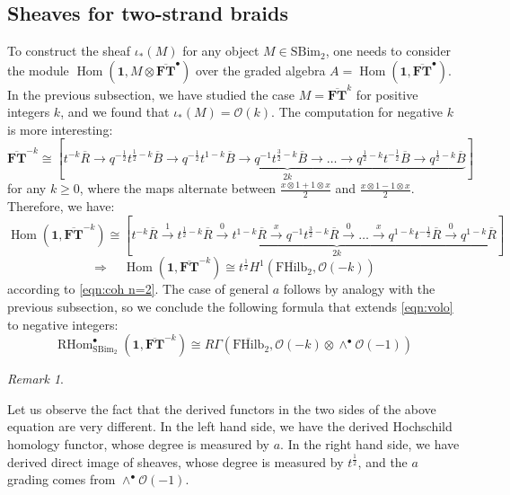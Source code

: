 \documentclass[12pt]{amsart}
\numberwithin{equation}{section}
\theoremstyle{definition}
\theoremstyle{remark}
\newtheorem{remark}[theorem]{Remark}
\DeclareMathOperator{\Hom}{Hom}
\DeclareMathOperator{\RHom}{{RHom}}
\newcommand{\CO}{\mathcal{O}}
\newcommand{\bFT}{\overline{\FT}}
\newcommand{\FT}{\mathbf{FT}}
\renewcommand{\1}{\mathbf{1}}
\newcommand{\FH}{\mathrm{FHilb}}
\newcommand{\SBim}{\mathrm{SBim}}
\newcommand{\bFH}{\overline{\FH}}
\newcommand{\Rred}{\overline{R}}
\newcommand{\Bred}{\overline{B}}
\begin{document}

\subsection{Sheaves for two-strand braids}
\label{sub:sheaves n=2}

To construct the sheaf $\iota_*(M)$ for any object $M \in \SBim_2$, one needs to consider the module $\Hom(\1, M \otimes \bFT^{\bullet})$ over the graded algebra $A = \Hom(\1,\bFT^{\bullet})$. In the previous subsection, we have studied the case $M = \bFT^k$ for positive integers $k$, and we found that $\iota_*(M) = \CO(k)$. The computation for negative $k$ is more interesting:
$$
\bFT^{-k} \cong  \left[t^{-k} \Rred  \rightarrow \underbrace{q^{-\frac 12} t^{\frac 12-k}  \Bred \rightarrow q^{-\frac 12} t^{1-k} \Bred \rightarrow q^{-1} t^{\frac 32-k} \Bred \rightarrow \dots \rightarrow q^{\frac 12-k} t^{-\frac 12} \Bred \rightarrow q^{\frac 12-k} \Bred}_{2k}  \right]  %
$$
for any $k\geq 0$, where the maps alternate between $\frac {x \otimes 1 + 1 \otimes x}2$ and $\frac {x \otimes 1 - 1 \otimes x}2$. Therefore, we have:
$$
\Hom(\1,\bFT^{-k}) \cong \left[t^{-k} \Rred  \xrightarrow{1} \underbrace{ t^{\frac 12-k} \Rred \xrightarrow{0} t^{1-k} \Rred \xrightarrow{x}  q^{-1} t^{\frac 32-k} \Rred  \xrightarrow{0} \dots \xrightarrow{x} q^{1-k} t^{-\frac 12} \Rred  \xrightarrow{0}  q^{1-k} \Rred}_{2k}  \right] 
$$
\begin{equation}
\label{eqn:negative hom n=2}
\Longrightarrow \quad \Hom(\1,\bFT^{-k}) \cong t^{\frac 12} H^1\left(\bFH_2,\CO(-k)\right) 
\end{equation}
according to \eqref{eqn:coh n=2}. The case of general $a$ follows by analogy with the previous subsection, so we conclude the following formula that extends \eqref{eqn:volo} to negative integers:
\begin{equation}
\label{eqn:formula}
\RHom^\bullet_{\SBim_2}(\1,\bFT^{-k}) \cong R\Gamma \left( \bFH_2,\CO(-k)\otimes \wedge^{\bullet} \CO(-1) \right)
\end{equation}


\begin{remark}
\label{rem:different gradings}

Let us observe the fact that the derived functors in the two sides of the above equation are very different. In the left hand side, we have the derived Hochschild homology functor, whose degree is measured by $a$. In the right hand side, we have derived direct image of sheaves, whose degree is measured by $t^{\frac 12}$, and the $a$ grading comes from $\wedge^\bullet \CO(-1)$.

\end{remark}
\end{document}
